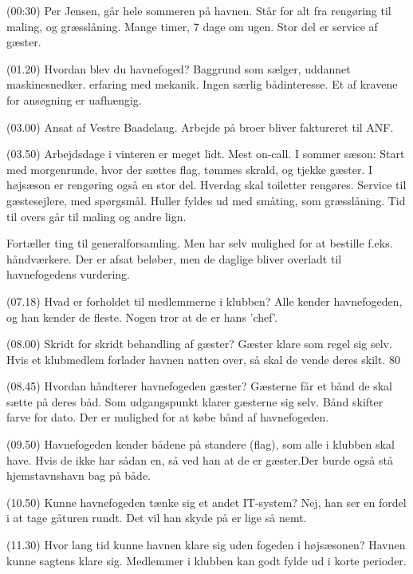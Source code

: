 (00:30) Per Jensen, går hele sommeren på havnen. Står for alt fra rengøring til maling, og græsslåning. Mange timer, 7 dage om ugen. Stor del er service af gæster.

(01.20) Hvordan blev du havnefoged? Baggrund som sælger, uddannet maskinesnedker. erfaring med mekanik. Ingen særlig bådinteresse. Et af kravene for ansøgning er uafhængig.

(03.00) Ansat af Vestre Baadelaug. Arbejde på broer bliver faktureret til ANF.

(03.50) Arbejdsdage i vinteren er meget lidt. Mest on-call. I sommer sæson: Start med morgenrunde, hvor der sættes flag, tømmes skrald, og tjekke gæster. I højsæson er rengøring også en stor del. Hverdag skal toiletter rengøres. Service til gæstesejlere, med spørgsmål. Huller fyldes ud med småting, som græsslåning. Tid til overs går til maling og andre lign.

Fortæller ting til generalforsamling. Men har selv mulighed for at bestille f.eks. håndværkere. Der er afsat beløber, men de daglige bliver overladt til havnefogedens vurdering.

(07.18) Hvad er forholdet til medlemmerne i klubben? Alle kender havnefogeden, og han kender de fleste. Nogen tror at de er hans 'chef'.

(08.00) Skridt for skridt behandling af gæster? Gæster klare som regel sig selv. Hvis et klubmedlem forlader havnen natten over, så skal de vende deres skilt. 80%

(08.45) Hvordan håndterer havnefogeden gæster? Gæsterne får et bånd de skal sætte på deres båd. Som udgangspunkt klarer gæsterne sig selv. Bånd skifter farve for dato. Der er mulighed for at købe bånd af havnefogeden.

(09.50) Havnefogeden kender bådene på standere (flag), som alle i klubben skal have. Hvis de ikke har sådan en, så ved han at de er gæster.Der burde også stå hjemstavnshavn bag på både. 

(10.50) Kunne havnefogeden tænke sig et andet IT-system? Nej, han ser en fordel i at tage gåturen rundt. Det vil han skyde på er lige så nemt. 

(11.30) Hvor lang tid kunne havnen klare sig uden fogeden i højsæsonen? Havnen kunne sagtens klare sig. Medlemmer i klubben kan godt fylde ud i korte perioder.


